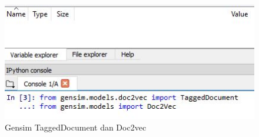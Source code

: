 \begin{enumerate}
\begin{figure}[!htbp]
\centerline{\includegraphics[width=1\textwidth]{figures/c5p/22.JPG}}
\caption{Gensim TaggedDocument dan Doc2vec}
\label{c5_22}
\end{figure}
\end{enumerate}
